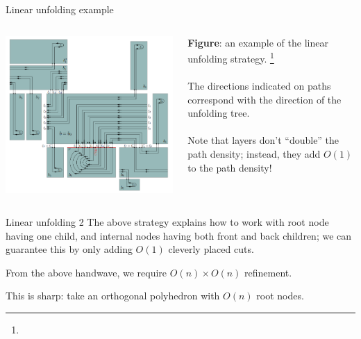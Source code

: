 \documentclass[handout]{beamer}
\theoremstyle{plain}
\begin{document}
\begin{frame}{Linear unfolding example}
  \begin{columns}
    \begin{column}{.7\textwidth}
      \includegraphics[height=.8\textheight]{./figs/Linear_unfolding.png}
    \end{column}
    \begin{column}{.3\textwidth}
      \footnotesize \textbf{Figure}: an example of the linear unfolding strategy.
      \footnote[frame]{}\\
      \;\\
      The directions indicated on paths correspond with the direction of the unfolding tree.\\
      \;\\
      Note that layers don't ``double'' the path density; instead, they add $O(1)$ to the path density!
    \end{column}
  \end{columns}
\end{frame}

\begin{frame}{Linear unfolding 2}
  The above strategy explains how to work with root node having one child, and internal nodes having both front and back children;
  we can guarantee this by only adding $O(1)$ cleverly placed cuts.

  \pause From the above handwave, we require $O(n) \times O(n)$ refinement.
  
  \pause This is sharp:
  take an orthogonal polyhedron with $O(n)$ root nodes.
\end{frame}
\end{document}
